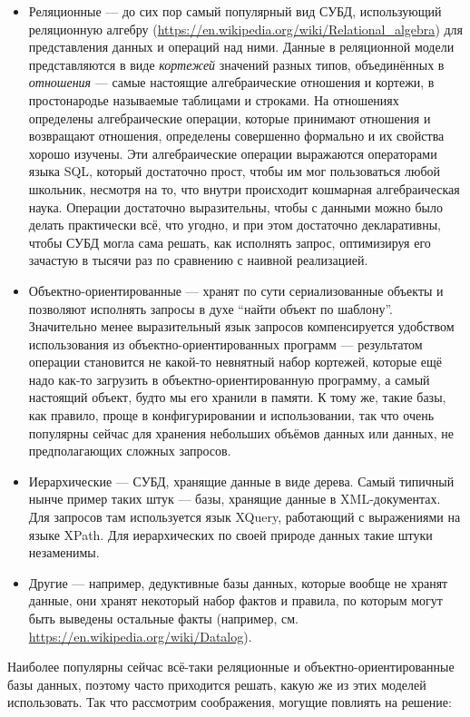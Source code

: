 \documentclass[a5paper]{article}
\begin{document}
\begin{itemize}
	\item Реляционные --- до сих пор самый популярный вид СУБД, использующий реляционную алгебру (\url{https://en.wikipedia.org/wiki/Relational_algebra}) для представления данных и операций над ними. Данные в реляционной модели представляются в виде \textit{кортежей} значений разных типов, объединённых в \textit{отношения} --- самые настоящие алгебраические отношения и кортежи, в простонародье называемые таблицами и строками. На отношениях определены алгебраические операции, которые принимают отношения и возвращают отношения, определены совершенно формально и их свойства хорошо изучены. Эти алгебраические операции выражаются операторами языка SQL, который достаточно прост, чтобы им мог пользоваться любой школьник, несмотря на то, что внутри происходит кошмарная алгебраическая наука. Операции достаточно выразительны, чтобы с данными можно было делать практически всё, что угодно, и при этом достаточно декларативны, чтобы СУБД могла сама решать, как исполнять запрос, оптимизируя его зачастую в тысячи раз по сравнению с наивной реализацией.
	\item Объектно-ориентированные --- хранят по сути сериализованные объекты и позволяют исполнять запросы в духе ``найти объект по шаблону''. Значительно менее выразительный язык запросов компенсируется удобством использования из объектно-ориентированных программ --- результатом операции становится не какой-то невнятный набор кортежей, которые ещё надо как-то загрузить в объектно-ориентированную программу, а самый настоящий объект, будто мы его хранили в памяти. К тому же, такие базы, как правило, проще в конфигурировании и использовании, так что очень популярны сейчас для хранения небольших объёмов данных или данных, не предполагающих сложных запросов.
	\item Иерархические --- СУБД, хранящие данные в виде дерева. Самый типичный нынче пример таких штук --- базы, хранящие данные в XML-документах. Для запросов там используется язык XQuery, работающий с выражениями на языке XPath. Для иерархических по своей природе данных такие штуки незаменимы.
	\item Другие --- например, дедуктивные базы данных, которые вообще не хранят данные, они хранят некоторый набор фактов и правила, по которым могут быть выведены остальные факты (например, см. \url{https://en.wikipedia.org/wiki/Datalog}). 
\end{itemize}

Наиболее популярны сейчас всё-таки реляционные и объектно-ориентированные базы данных, поэтому часто приходится решать, какую же из этих моделей использовать. Так что рассмотрим соображения, могущие повлиять на решение:
\end{document}
